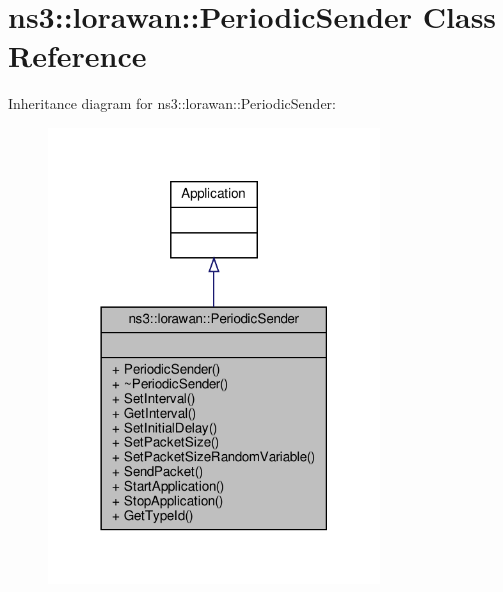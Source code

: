 \hypertarget{classns3_1_1lorawan_1_1PeriodicSender}{}\section{ns3\+:\+:lorawan\+:\+:Periodic\+Sender Class Reference}
\label{classns3_1_1lorawan_1_1PeriodicSender}


Inheritance diagram for ns3\+:\+:lorawan\+:\+:Periodic\+Sender\+:
\nopagebreak
\begin{figure}[H]
\begin{center}
\leavevmode
\includegraphics[width=249pt]{classns3_1_1lorawan_1_1PeriodicSender__inherit__graph}
\end{center}
\end{figure}


